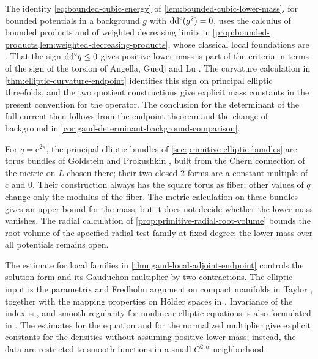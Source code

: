 The identity \eqref{eq:bounded-cubic-energy} of \cref{lem:bounded-cubic-lower-mass}, for bounded potentials in a background $g$ with $\mathrm{dd}^{\mathrm{c}}(g^2)=0$, uses the calculus of bounded products and of weighted decreasing limits in \cref{prop:bounded-products,lem:weighted-decreasing-products}, whose classical local foundations are \cite[Section~2, Theorems~2.1 and~2.4, pp.~4--9]{BT82}. That the sign $\mathrm{dd}^{\mathrm{c}} g\leq0$ gives positive lower mass is part of the criteria in terms of the sign of the torsion of Angella, Guedj and Lu \cite[Theorem~3.2, pp.~4641--4642]{AGL23}. The curvature calculation in \cref{thm:elliptic-curvature-endpoint} identifies this sign on principal elliptic threefolds, and the two quotient constructions give explicit mass constants in the present convention for the operator. The conclusion for the determinant of the full current then follows from the endpoint theorem and the change of background in \cref{cor:gaud-determinant-background-comparison}.

For $q=\mathrm{e}^{2\pi}$, the principal elliptic bundles of \cref{sec:primitive-elliptic-bundles} are torus bundles of Goldstein and Prokushkin \cite[Section~2, pp.~69--71]{GP04}, built from the Chern connection of the metric on $L$ chosen there; their two closed $2$-forms are a constant multiple of $c$ and $0$. Their construction always has the square torus as fiber; other values of $q$ change only the modulus of the fiber. The metric calculation on these bundles gives an upper bound for the mass, but it does not decide whether the lower mass vanishes. The radial calculation of \cref{prop:primitive-radial-root-volume} bounds the root volume of the specified radial test family at fixed degree; the lower mass over all potentials remains open.

The estimate for local families in \cref{thm:gaud-local-adjoint-endpoint} controls the solution form and its Gauduchon multiplier by two contractions. The elliptic input is the parametrix and Fredholm argument on compact manifolds in Taylor \cite[Chapter~7, Sections~4 and~10, especially (10.4)--(10.6)]{Taylor7}, together with the mapping properties on H\"older spaces in \cite[Chapter~13, (8.7), (8.17) and (8.22)]{Taylor13}. Invariance of the index is \cite[Section~7, Proposition~7.4]{TaylorFA}, and smooth regularity for nonlinear elliptic equations is also formulated in \cite[Proposition]{TaylorReg}. The estimates for the equation and for the normalized multiplier give explicit constants for the densities without assuming positive lower mass; instead, the data are restricted to smooth functions in a small $C^{2,\alpha}$ neighborhood.

